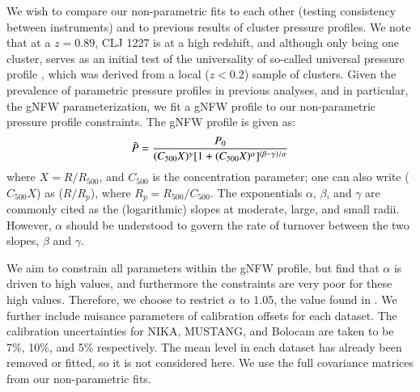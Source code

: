 \documentclass[twocolumn,traditabstract]{aa}
\begin{document}
We wish to compare our non-parametric fits to each other (testing consistency between instruments)
and to previous results of cluster pressure profiles. We note that at a $z = 0.89$, CLJ 1227 is at a high redshift,
and although only being one cluster, serves as an initial test of the universality of so-called universal pressure
profile \citep{arnaud2010}, which was derived from a local ($z < 0.2$) sample of clusters.
Given the prevalence of parametric pressure profiles in previous analyses, and in particular, the gNFW parameterization,
we fit a gNFW profile to our non-parametric pressure profile constraints. The gNFW profile is given as:
\begin{equation}
  \Tilde{P} = \frac{P_0}{(C_{500} X)^{\gamma} [1 + (C_{500} X)^{\alpha}]^{(\beta - \gamma)/\alpha}}
  \label{eqn:gnfw_profile}
\end{equation}
where $X = R / R_{500}$, and $C_{500}$ is the concentration parameter; one can also write ($C_{500} X$) as
($R / R_p$), where $R_p = R_{500}/C_{500}$. The exponentials $\alpha$, $\beta$, and $\gamma$ are commonly
cited as the (logarithmic) slopes at moderate, large, and small radii. However, $\alpha$ should be
understood to govern the rate of turnover between the two slopes, $\beta$ and $\gamma$. 


We aim to constrain all parameters within the gNFW profile, but find that $\alpha$ is driven to high values, and
furthermore the constraints are very poor for these high values. Therefore, we choose to restrict $\alpha$ to 1.05,
the value found in . We further include nuisance parameters of calibration offsets for each dataset.
The calibration uncertainties for NIKA, MUSTANG, and Bolocam are taken to be 7\%, 10\%, and 5\% respectively.
The mean level in each dataset has already been removed or fitted, so it is not considered here. We use the full
covariance matrices from our non-parametric fits.
\end{document}
